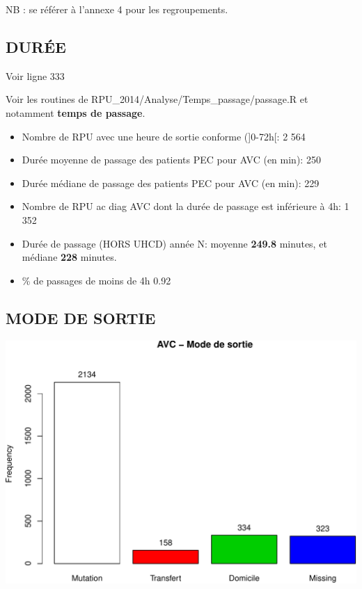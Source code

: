 \documentclass[]{article}
\begin{document}
NB : se référer à l'annexe 4 pour les regroupements.

\subsection{DURÉE}\label{duree-1}

Voir ligne 333

Voir les routines de RPU\_2014/Analyse/Temps\_passage/passage.R et
notamment \textbf{temps de passage}.

\begin{itemize}
\item
  Nombre de RPU avec une heure de sortie conforme ({]}0-72h{[}: 2 564
\item
  Durée moyenne de passage des patients PEC pour AVC (en min): 250
\item
  Durée médiane de passage des patients PEC pour AVC (en min): 229
\item
  Nombre de RPU ac diag AVC dont la durée de passage est inférieure à
  4h: 1 352
\item
  Durée de passage (HORS UHCD) année N: moyenne \textbf{249.8} minutes,
  et médiane \textbf{228} minutes.
\item
  \% de passages de moins de 4h 0.92
\end{itemize}

\subsection{MODE DE SORTIE}\label{mode-de-sortie-2}

\includegraphics{rapport2014_V4_files/figure-latex/avc_mode_sortie-1.pdf}
\end{document}
